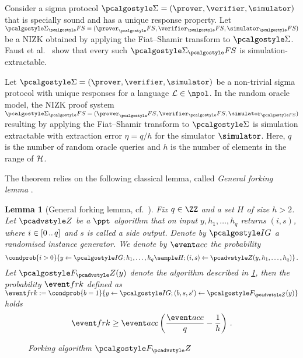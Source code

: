 \let\accentvec\vec \documentclass[runningheads,10pt]{llncs}
\newtheorem{lemma}[theorem]{Lemma}
\begin{document}
Consider a sigma protocol $\sigmaprot = (\prover, \verifier, \simulator)$ that
is specially sound and has a unique response property. Let $\sigmaprot_\fs = (\prover_\fs, \verifier_\fs, \simulator_\fs)$ be a NIZK obtained by applying the Fiat--Shamir transform to $\sigmaprot$.
Faust et al.~\cite{INDOCRYPT:FKMV12} show that every such $\sigmaprot_\fs$ is simulation-extractable.

\begin{theorem}
	Let $\sigmaprot = (\prover, \verifier, \simulator)$ be a non-trivial sigma protocol with unique responses for a language $\LANG \in \npol$.
	In the random oracle model, the NIZK proof system $\sigmaprot_\fs = (\prover_\fs, \verifier_\fs, \simulator_{\fs})$ resulting by applying the Fiat--Shamir transform to $\sigmaprot$ is simulation extractable with extraction error $\eta = q/h$ for the simulator $\simulator$. Here, $q$ is the number of random oracle queries and $h$ is the number of elements in the range of $\mathcal{H}$.
\end{theorem}

The theorem relies on the following classical lemma, called \emph{General forking lemma} \cite{JC:PoiSte00}.

\begin{lemma}[General forking lemma, cf.~\cite{INDOCRYPT:FKMV12,CCS:BelNev06}]
	\label{lem:forking_lemma}
	Fix $q \in \ZZ$ and a set $H$ of size $h > 2$. Let $\zdv$ be a $\ppt$ algorithm that on input $y, h_1, \ldots, h_q$ returns $(i, s)$, where $i \in[0 \, .. \, q]$ and $s$ is called a \emph{side output}.
	Denote by $\ig$ a randomised instance generator.
	We denote by $\accProb$ the probability
	\[
		\condprob{i > 0}{y \gets \ig; h_1, \ldots, h_q \sample H; (i, s) \gets
		\zdv(y, h_1, \ldots, h_q)}\,.
	\]
	Let $\forking_\zdv(y)$ denote the algorithm described in \cref{fig:forking_lemma}, then the probability $\frkProb$ defined as
	$
		\frkProb := \condprob{b = 1}{y \gets \ig; (b, s, s') \gets
		\forking_{\zdv}(y)}
	$
	holds
	\[
		\frkProb \geq \accProb \brak{\frac{\accProb}{q} - \frac{1}{h}}\,.
	\]
	\begin{figure}[t]
		\centering
		\caption{Forking algorithm $\forking_\zdv$}
		\label{fig:forking_lemma}
\end{figure}
\end{lemma}
\end{document}
